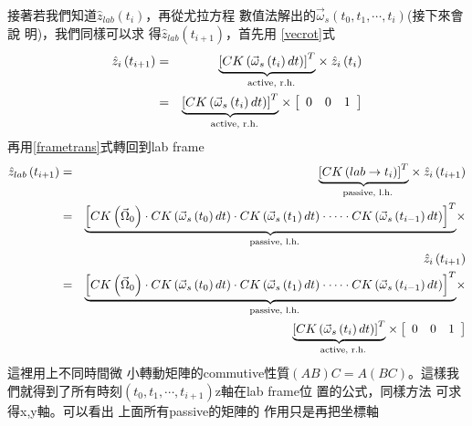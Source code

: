 \documentclass[12pt,twoside]{article}
\begin{document}
接著若我們知道$\hat{z}_{lab}\left(
t_{i}\right) $，再從尤拉方程%
數值法解出的$\vec{\omega}_{s}\left(
t_{0},t_{1},\cdots ,t_{i}\right) $(接下來會說%
明)，我們同樣可以求%
得$\hat{z}_{lab}\left( t_{i+1}\right) $，首先用%
\ref{vecrot}式%
\begin{eqnarray*}
\hat{z}_{i}\left( t_{i+1}\right) &=&\underset{\text{active, r.h.}}{%
\underbrace{\left[ CK\left( \vec{\omega}_{s}\left( t_{i}\right) dt\right) %
\right] ^{T}}}\times \hat{z}_{i}\left( t_{i}\right) \\
&=&\underset{\text{active, r.h.}}{\underbrace{\left[ CK\left( \vec{\omega}%
_{s}\left( t_{i}\right) dt\right) \right] ^{T}}}\times \left[ 
\begin{array}{ccc}
0 & 0 & 1%
\end{array}%
\right]
\end{eqnarray*}%
再用\ref{frametrans}式轉回到lab frame%
\begin{eqnarray}
\hat{z}_{lab}\left( t_{i+1}\right) &=&\underset{\text{passive, l.h.}}{%
\underbrace{\left[ CK\left( lab\rightarrow t_{i}\right) \right] ^{T}}}\times 
\hat{z}_{i}\left( t_{i+1}\right)  \notag \\
&=&\underset{\text{passive, l.h.}}{\underbrace{\left[ CK\left( \vec{\Omega}%
_{0}\right) \cdot CK\left( \vec{\omega}_{s}\left( t_{0}\right) dt\right)
\cdot CK\left( \vec{\omega}_{s}\left( t_{1}\right) dt\right) \cdot \cdots
\cdot CK\left( \vec{\omega}_{s}\left( t_{i-1}\right) dt\right) \right] ^{T}}}%
\times  \notag \\
&&\hat{z}_{i}\left( t_{i+1}\right)  \notag \\
&=&\underset{\text{passive, l.h.}}{\underbrace{\left[ CK\left( \vec{\Omega}%
_{0}\right) \cdot CK\left( \vec{\omega}_{s}\left( t_{0}\right) dt\right)
\cdot CK\left( \vec{\omega}_{s}\left( t_{1}\right) dt\right) \cdot \cdots
\cdot CK\left( \vec{\omega}_{s}\left( t_{i-1}\right) dt\right) \right] ^{T}}}%
\times  \notag \\
&&\underset{\text{active, r.h.}}{\underbrace{\left[ CK\left( \vec{\omega}%
_{s}\left( t_{i}\right) dt\right) \right] ^{T}}}\times \left[ 
\begin{array}{ccc}
0 & 0 & 1%
\end{array}%
\right]  \label{iterateeq0}
\end{eqnarray}%
這裡用上不同時間微%
小轉動矩陣的commutive性質$%
\left( AB\right) C=A\left( BC\right) $。這樣我%
們就得到了所有時刻$%
\left( t_{0},t_{1},\cdots ,t_{i+1}\right) $z軸在lab frame位%
置的公式，同樣方法%
可求得x,y軸。可以看出%
上面所有passive的矩陣的%
作用只是再把坐標軸%
\end{document}
